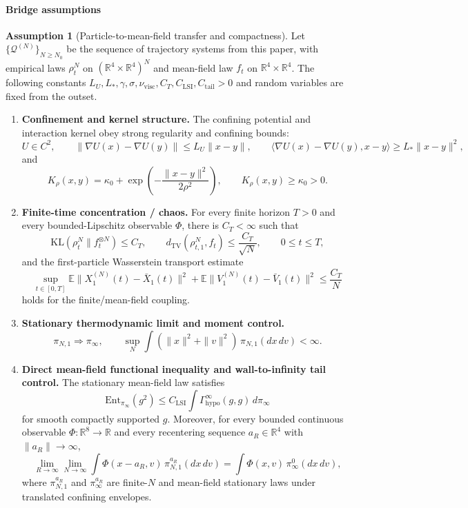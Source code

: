 \documentclass[11pt]{article}
\theoremstyle{definition}
\newtheorem{assumption}[theorem]{Assumption}
\theoremstyle{remark}
\newcommand{\R}{\mathbb R}
\newcommand{\E}{\mathbb E}
\newcommand{\KL}{\mathrm{KL}}
\newcommand{\Ent}{\mathrm{Ent}}
\newcommand{\TV}{\mathrm{TV}}
\newcommand{\mcQ}{\mathcal Q}
\begin{document}
\paragraph{Bridge assumptions}
\begin{assumption}[Particle-to-mean-field transfer and compactness]
\label{ass:bridge-backbone}
Let $\{\mcQ^{(N)}\}_{N\ge N_0}$ be the sequence of trajectory systems from this
paper, with empirical laws $\rho_t^N$ on $(\R^4\times\R^4)^N$ and mean-field
law $f_t$ on $\R^4\times\R^4$.
The following constants $L_U,L_*,\gamma,\sigma,\nu_{\mathrm{visc}},C_T,C_{\mathrm{LSI}},
C_{\mathrm{tail}}>0$ and random variables are fixed from the outset.
\begin{enumerate}[leftmargin=1.5em,label=\textnormal{(\roman*)}]
\item \textbf{Confinement and kernel structure.}
The confining potential and interaction kernel obey strong regularity and confining
bounds:
\[
U\in C^2,\qquad \|\nabla U(x)-\nabla U(y)\|\le L_U\|x-y\|,\qquad
\langle \nabla U(x)-\nabla U(y),x-y\rangle\ge L_*\|x-y\|^2,
\]
and
\[
K_{\rho}(x,y)=\kappa_0+\exp\!\left(-\frac{\|x-y\|^2}{2\rho^2}\right),
\qquad
K_{\rho}(x,y)\ge \kappa_0>0.
\]
\item \textbf{Finite-time concentration / chaos.}
For every finite horizon $T>0$ and every bounded-Lipschitz observable
$\Phi$, there is $C_T<\infty$ such that
\[
\KL(\rho_t^N\|f_t^{\otimes N})\le C_T,\qquad
d_{\TV}(\rho_{t,1}^N,f_t)\le\frac{C_T}{\sqrt N},
\qquad 0\le t\le T,
\]
and the first-particle Wasserstein transport estimate
\[
\sup_{t\in[0,T]}\E\|X_1^{(N)}(t)-\bar X_1(t)\|^2+\E\|V_1^{(N)}(t)-\bar V_1(t)\|^2
\le \frac{C_T}{N}
\]
holds for the finite/mean-field coupling.
\item \textbf{Stationary thermodynamic limit and moment control.}
\[
\pi_{N,1}\Rightarrow\pi_\infty,
\qquad
\sup_N\int(\|x\|^2+\|v\|^2)\,\pi_{N,1}(dx\,dv)<\infty.
\]
\item \textbf{Direct mean-field functional inequality and wall-to-infinity tail control.}
The stationary mean-field law satisfies
\[
\Ent_{\pi_\infty}(g^2)\le C_{\mathrm{LSI}}
\int\Gamma_{\mathrm{hypo}}^\infty(g,g)\,d\pi_\infty
\]
for smooth compactly supported \(g\). Moreover, for every bounded continuous
observable $\Phi:\R^8\to\R$ and every recentering sequence $a_R\in\R^4$ with
$\|a_R\|\to\infty$,
\[
\lim_{R\to\infty}\lim_{N\to\infty}
\int\Phi(x-a_R,v)\,\pi_{N,1}^{a_R}(dx\,dv)
=
\int\Phi(x,v)\,\pi_{\infty}^0(dx\,dv),
\]
where $\pi_{N,1}^{a_R}$ and $\pi_\infty^{a_R}$ are finite-$N$ and mean-field stationary
laws under translated confining envelopes.
\end{enumerate}
\end{assumption}
\end{document}
